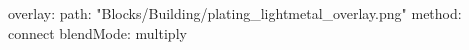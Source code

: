 overlay:
  path: "Blocks/Building/plating_lightmetal_overlay.png"
  method: connect
  blendMode: multiply